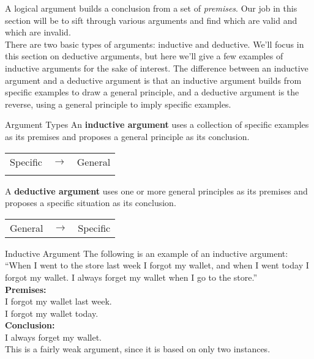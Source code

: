 \setcounter{ExampleCounter}{1}
A logical argument builds a conclusion from a set of \textit{premises}.  Our job in this section will be to sift through various arguments and find which are valid and which are invalid.\\

There are two basic types of arguments: inductive and deductive.  We'll focus in this section on deductive arguments, but here we'll give a few examples of inductive arguments for the sake of interest.  The difference between an inductive argument and a deductive argument is that an inductive argument builds from specific examples to draw a general principle, and a deductive argument is the reverse, using a general principle to imply specific examples.\\

\begin{proc}{Argument Types}
An \textbf{inductive argument} uses a collection of specific examples as its premises and proposes a general principle as its conclusion.
\begin{center}
{\Large
\begin{tabular}{r c l}
Specific & $\longrightarrow$ & General\\
& & 
\end{tabular}}
\end{center}

A \textbf{deductive argument} uses one or more general principles as its premises and proposes a specific situation as its conclusion.
\begin{center}
{\Large
\begin{tabular}{r c l}
General & $\longrightarrow$ & Specific
\end{tabular}}
\end{center}
\end{proc}

\begin{example}[https://www.youtube.com/watch?v=F7w7wOvpntA]{Inductive Argument}
The following is an example of an inductive argument:\\
``When I went to the store last week I forgot my wallet, and when I went today I forgot my wallet.  I always forget my wallet when I go to the store.''\\

\textbf{Premises:}\\
I forgot my wallet last week.\\
I forgot my wallet today.\\

\textbf{Conclusion:}\\
I always forget my wallet.\\

This is a fairly weak argument, since it is based on only two instances.
\end{example}

